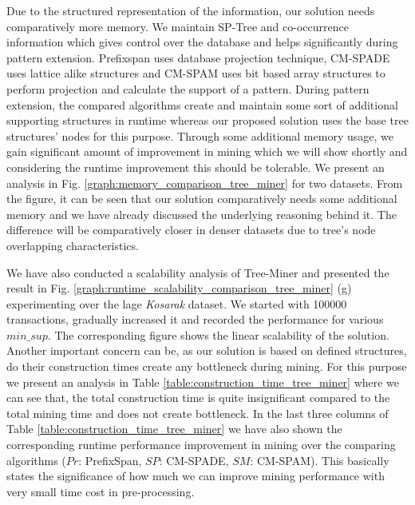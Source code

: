 Due to the structured representation of the information, our solution needs comparatively more memory. We maintain SP-Tree and co-occurrence information which gives control over the database and helps significantly during pattern extension. Prefixspan uses database projection technique, CM-SPADE uses lattice alike structures and CM-SPAM uses bit based array structures to perform projection and calculate the support of a pattern. During pattern extension, the compared algorithms create and maintain some sort of additional supporting structures in runtime whereas our proposed solution uses the base tree structures' nodes for this purpose. Through some additional memory usage, we gain significant amount of improvement in mining which we will show shortly and considering the runtime improvement this should be tolerable. We present an analysis in Fig. \ref{graph:memory_comparison_tree_miner} for two datasets. From the figure, it can be seen that our solution comparatively needs some additional memory and we have already discussed the underlying reasoning behind it. The difference will be comparatively closer in denser datasets due to tree's node overlapping characteristics.

We have also conducted a scalability analysis of Tree-Miner and presented the result in Fig. \ref{graph:runtime_scalability_comparison_tree_miner} (g) experimenting over the lage \textit{Kosarak} dataset. We started with 100000 transactions, gradually increased it and recorded the performance for various $min\_sup$. The corresponding figure shows the linear scalability of the solution. Another important concern can be, as our solution is based on defined structures, do their construction times create any bottleneck during mining. For this purpose we present an analysis in Table \ref{table:construction_time_tree_miner} where we can see that, the total construction time is quite insignificant compared to the total mining time and does not create bottleneck. In the last three columns of Table \ref{table:construction_time_tree_miner} we have also shown the corresponding runtime performance improvement in mining over the comparing algorithms ($Pr$: PrefixSpan, $SP$: CM-SPADE, $SM$: CM-SPAM). This basically states the significance of how much we can improve mining performance with very small time cost in pre-processing.



